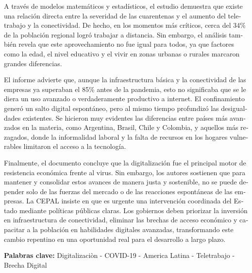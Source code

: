 \documentclass{article}
\begin{document}
\begin{tcolorbox}[colback=brown!8!white,colframe=brown!8!white,boxrule=0pt,arc=2pt,left=4pt,right=4pt,top=3pt,bottom=3pt,before skip=4pt,after skip=4pt]
\begin{otherlanguage}{spanish}
A través de modelos matemáticos y estadísticos, el estudio demuestra que existe una relación directa entre la severidad de las cuarentenas y el aumento del teletrabajo y la conectividad. De hecho, en los momentos más críticos, cerca del 34\% de la población regional logró trabajar a distancia. Sin embargo, el análisis también revela que este aprovechamiento no fue igual para todos, ya que factores como la edad, el nivel educativo y el vivir en zonas urbanas o rurales marcaron grandes diferencias.

El informe advierte que, aunque la infraestructura básica y la conectividad de las empresas ya superaban el 85\% antes de la pandemia, esto no significaba que se le diera un uso avanzado o verdaderamente productivo a internet. El confinamiento generó un salto digital espontáneo, pero al mismo tiempo profundizó las desigualdades existentes. Se hicieron muy evidentes las diferencias entre países más avanzados en la materia, como Argentina, Brasil, Chile y Colombia, y aquellos más rezagados, donde la informalidad laboral y la falta de recursos en los hogares vulnerables limitaron el acceso a la tecnología.

Finalmente, el documento concluye que la digitalización fue el principal motor de resistencia económica frente al virus. Sin embargo, los autores sostienen que para mantener y consolidar estos avances de manera justa y sostenible, no se puede depender solo de las fuerzas del mercado o de las reacciones espontáneas de las empresas. La CEPAL insiste en que es urgente una intervención coordinada del Estado mediante políticas públicas claras. Los gobiernos deben priorizar la inversión en infraestructura de conectividad, eliminar las brechas de acceso económico y capacitar a la población en habilidades digitales avanzadas, transformando este cambio repentino en una oportunidad real para el desarrollo a largo plazo.
\par\smallskip\noindent\textbf{Palabras clave:} Digitalizaciòn - COVID-19 - America Latina - Teletrabajo - Brecha Digital
\end{otherlanguage}
\end{tcolorbox}
\end{document}
